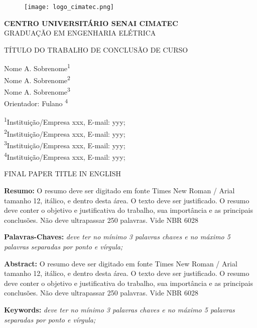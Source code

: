 \documentclass[../main.tex]{subfiles}
\renewcommand\maketitle{
    \begin{figure}[t]
        \centering
        \texttt{[image: logo\_cimatec.png]}
    \end{figure}
    
    \begin{center}
        \textbf{\MakeUppercase{Centro Universitário Senai Cimatec}}
        \\
        \MakeUppercase{Graduação em Engenharia Elétrica}
        
        \vspace{\baselineskip}
        
        \begin{large}
          \MakeUppercase{Título do Trabalho de Conclusão de Curso}
        \end{large}
    \end{center}

    

    \begin{flushright}
        Nome A. Sobrenome\textsuperscript{1}\\
        Nome A. Sobrenome\textsuperscript{2}\\
        Nome A. Sobrenome\textsuperscript{3}\\
        Orientador: Fulano \textsuperscript{4}
    \end{flushright}
    \begin{flushleft}
      \begin{small}
          \textsuperscript{1}Instituição/Empresa xxx, E-mail: yyy;\\
          \textsuperscript{2}Instituição/Empresa xxx, E-mail: yyy;\\
          \textsuperscript{3}Instituição/Empresa xxx, E-mail: yyy;\\      
          \textsuperscript{4}Instituição/Empresa xxx, E-mail: yyy;
      \end{small}
    \end{flushleft}

    \begin{center}
      \begin{large}
        \MakeUppercase{Final Paper Title in English}
      \end{large}
    \end{center}

    \noindent\textbf{Resumo:} 
      O resumo deve ser digitado em fonte Times New Roman / Arial tamanho 12,  itálico, e dentro desta área. O texto deve ser justificado. O resumo deve conter o objetivo  e  justificativa  do  trabalho,  sua  importância  e  as  principais  conclusões.  Não  deve  ultrapassar 250 palavras. Vide NBR 6028

    \noindent\textbf{Palavras-Chaves:} 
      \textit{deve  ter  no  mínimo  3  palavras  chaves  e  no  máximo  5  palavras  separadas por ponto e vírgula;}

    \vspace{\baselineskip}
      
    \noindent\textbf{Abstract:} 
      O resumo deve ser digitado em fonte Times New Roman / Arial tamanho 12,  itálico, e dentro desta área. O texto deve ser justificado. O resumo deve conter o objetivo  e  justificativa  do  trabalho,  sua  importância  e  as  principais  conclusões.  Não  deve  ultrapassar 250 palavras. Vide NBR 6028
    
    \noindent\textbf{Keywords:} 
      \textit{deve  ter  no  mínimo  3  palavras  chaves  e  no  máximo  5  palavras  separadas por ponto e vírgula;}
    
}
\begin{document}
    \onecolumn
    \maketitle
    \newpage
    \twocolumn
\end{document}
